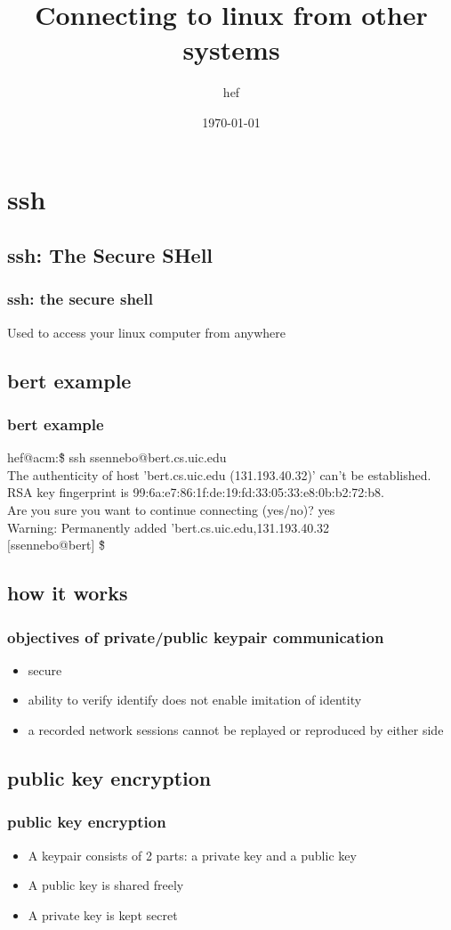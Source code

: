 \documentclass[hyperref={pdfpagelabels=false}]{beamer}
\title{Connecting to linux from other systems}
\author{hef}
\date{\today}
\begin{document}
\frame{\titlepage}
\section[outline]{}
\frame[allowframebreaks]{\tableofcontents}
\section{ssh}
\subsection{ssh: The Secure SHell}
\frame
{
  \frametitle{ssh: the secure shell}
  Used to access your linux computer from anywhere
}
\subsection{bert example}
\frame
{
  \frametitle{bert example}
  hef@acm:\~\$ ssh ssennebo@bert.cs.uic.edu\\
  The authenticity of host 'bert.cs.uic.edu (131.193.40.32)' can't be established.\\
  RSA key fingerprint is 99:6a:e7:86:1f:de:19:fd:33:05:33:e8:0b:b2:72:b8.\\
  Are you sure you want to continue connecting (yes/no)? yes\\
  Warning: Permanently added 'bert.cs.uic.edu,131.193.40.32\\
  $[$ssennebo@bert$]$ \~\$
}
\subsection{how it works}
\frame
{
  \frametitle{objectives of private/public keypair communication}
  \begin{itemize}
  \item{secure}
  \item{ability to verify identify does not enable imitation of identity}
  \item{a recorded network sessions cannot be replayed or reproduced by either side}
  \end{itemize}
}
\subsection{public key encryption}
\frame
{
    \frametitle{public key encryption}
    \begin{itemize}
    \item{A keypair consists of 2 parts: a private key and a public key}
    \item{A public key is shared freely}
    \item{A private key is kept secret}
    \end{itemize}
}
\end{document}

